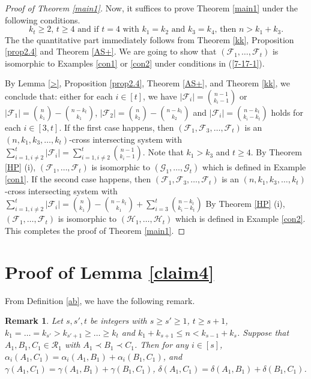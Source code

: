 \documentclass[a4paper,11pt]{article}
\newtheorem{remark}[theorem]{Remark}
\begin{document}
\begin{proof}[Proof of Theorem \ref{main1}]
Now, it suffices to  prove Theorem \ref{main1} under the following conditions.
\begin{equation}\label{7-17-1}
\text{$k_t\geq 2$, $t\geq 4$ and if $t=4$ with $k_1=k_2$ and $k_3=k_4$, then $n>k_1+k_3$.}
\end{equation}
The the quantitative part  immediately follows from  Theorem \ref{kk}, Proposition \ref{prop2.4} and Theorem \ref{AS+}.
We are going to show that  $(\mathcal{F}_1, \dots, \mathcal{F}_t)$  is isomorphic to Examples \ref{con1} or \ref{con2} under conditions in (\ref{7-17-1}).

By Lemma \ref{>}, Proposition \ref{prop2.4}, Theorem \ref{AS+}, and Theorem \ref{kk}, we conclude that:  either for each $i\in [t]$, we have $|\mathcal{F}_i|={n-1\choose k_i-1}$ or $|\mathcal{F}_1|={n\choose k_1}-{n-k_t\choose k_1}$, $|\mathcal{F}_2|={n\choose k_2}-{n-k_t\choose k_2}$ and $|\mathcal{F}_i|={n-k_t\choose k_i-k_t}$ holds for each $i\in [3, t]$.
If the first case happens, then $(\mathcal{F}_1, \mathcal{F}_3,\dots, \mathcal{F}_t)$ is an $(n, k_1, k_3, \dots, k_t)$-cross intersecting system with
$\sum_{i=1, i\ne 2}^t|\mathcal{F}_i|=\sum_{i=1, i\ne 2}^t{n-1\choose k_i-1}$.
Note that $k_1>k_3$ and $t\geq 4$. By Theorem \ref{HP} (i),  $(\mathcal{F}_1, \dots, \mathcal{F}_t)$ is isomorphic to $(\mathcal{G}_1, \dots, \mathcal{G}_t)$ which is defined in Example \ref{con1}.
If the second case happens, then $(\mathcal{F}_1, \mathcal{F}_3,\dots, \mathcal{F}_t)$ is an $(n, k_1, k_3, \dots,  k_t)$-cross intersecting system with
$\sum_{i=1, i\ne 2}^t|\mathcal{F}_i|={n\choose k_1}-{n-k_t\choose k_1}+\sum_{i=3}^t{n-k_t\choose k_i-k_t}$
By Theorem \ref{HP}  (i),  $(\mathcal{F}_1, \dots, \mathcal{F}_t)$ is isomorphic to $(\mathcal{H}_1, \dots, \mathcal{H}_t)$ which is defined in Example \ref{con2}.
 This completes the proof of Theorem \ref{main1}.
 \end{proof}







\section{Proof of Lemma \ref{claim4}}\label{sec5}
From Definition \ref{ab}, we have the following remark.
\begin{remark}\label{add}
Let $s, s', t$ be integers with $s\geq s'\geq 1$, $t\geq s+1$, $k_1=\dots=k_{s'}> k_{s'+1}\geq\dots\geq k_t$ and $k_1+k_{s+1}\leq n <k_{s-1}+k_s$.
Suppose that $A_1, B_1, C_1\in \mathcal{R}_1$ with $A_1\prec B_1\prec C_1$. Then
for any $i\in [s]$,
$
\alpha_i(A_1, C_1)=\alpha_i(A_1, B_1)+\alpha_i(B_1, C_1)$, and
$\gamma(A_1, C_1)=\gamma(A_1, B_1)+\gamma(B_1, C_1)$,
 $\delta(A_1, C_1)=\delta(A_1, B_1)+\delta(B_1, C_1)$.
\end{remark}
\end{document}
